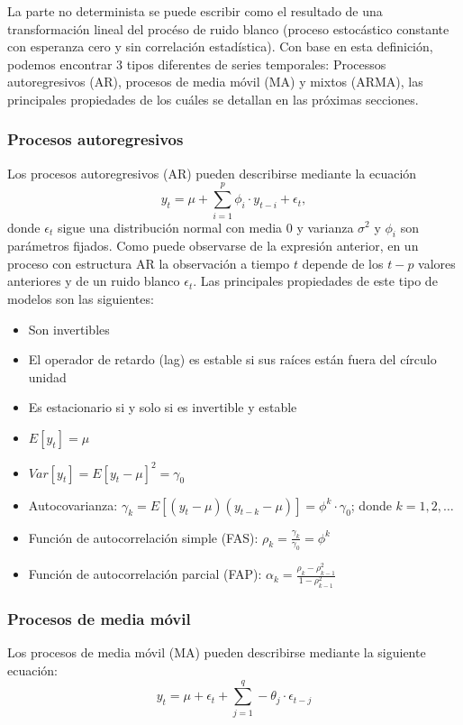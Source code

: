\documentclass[12pt,twoside]{article} %
\begin{document}
La parte no determinista se puede escribir como el resultado de una transformación lineal del procéso de ruido blanco (proceso estocástico constante con esperanza cero y sin correlación estadística). Con base en esta definición, podemos encontrar 3 tipos diferentes de series temporales: Processos autoregresivos (AR), procesos de media móvil (MA) y mixtos (ARMA), las principales propiedades de los cuáles se detallan en las próximas secciones.

\subsubsection{Procesos autoregresivos}
Los procesos autoregresivos (AR) pueden describirse mediante la ecuación
\begin{equation}
y_t = \mu + \sum_{i=1}^p \phi_i \cdot y_{t-i} + \epsilon_t,
\end{equation}
donde $\epsilon_t$ sigue una distribución normal con media 0 y varianza $\sigma^2$ y $\phi_i$ son parámetros fijados. Como puede observarse de la expresión anterior, en un proceso con estructura AR la observación a tiempo $t$ depende de los $t-p$ valores anteriores y de un ruido blanco $\epsilon_t$. Las principales propiedades de este tipo de modelos son las siguientes:
\begin{itemize}
 \item Son invertibles
 \item El operador de retardo (lag) es estable si sus raíces están fuera del círculo unidad
 \item Es estacionario si y solo si es invertible y estable
 \item $E[y_t]=\mu$
 \item $Var[y_t]=E[y_t-\mu]^2=\gamma_0$
 \item Autocovarianza: $\gamma_k=E[(y_t-\mu)(y_{t-k}-\mu)]=\phi^k \cdot \gamma_0$; donde $k=1,2, \ldots$
 \item Función de autocorrelación simple (FAS): $\rho_k=\frac{\gamma_k}{\gamma_0}=\phi^k$
 \item Función de autocorrelación parcial (FAP): $\alpha_k=\frac{\rho_k-\rho_{k-1}^2}{1-\rho_{k-1}^2}$
\end{itemize}

\subsubsection{Procesos de media móvil}
Los procesos de media móvil (MA) pueden describirse mediante la siguiente ecuación:
\begin{equation}
y_t= \mu + \epsilon_t+\sum_{j=1}^q -\theta_j \cdot \epsilon_{t-j}
\end{equation}
\end{document}
